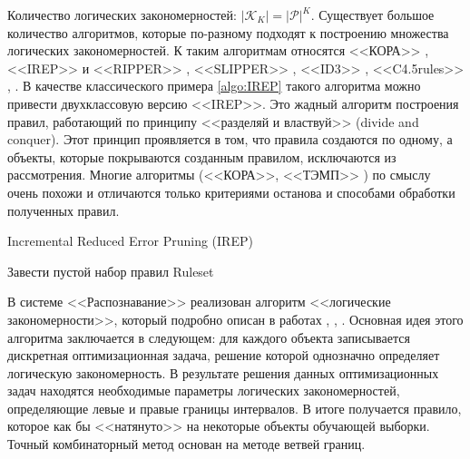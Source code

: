 \documentclass[12pt]{article}
\begin{document}
Количество логических закономерностей: \(\lvert \mathcal{K}_K \rvert =
\lvert \mathcal{P} \rvert^{K}\). Существует большое количество
алгоритмов, которые по-разному подходят к построению множества
логических закономерностей. К таким алгоритмам относятся <<КОРА>>
\cite{vainzvaig73kora}, <<IREP>> и <<RIPPER>> \cite{cohen95fast},
<<SLIPPER>> \cite{cohen99simple}, <<ID3>> \cite{quinlan86induction},
<<C4.5rules>> \cite{quinlan93programs}, \cite{quinlan96bagging}.  В
качестве классического примера \ref{algo:IREP} такого алгоритма можно
привести двухклассовую версию <<IREP>>. Это жадный алгоритм построения
правил, работающий по принципу <<разделяй и властвуй>> (divide and
conquer). Этот принцип проявляется в том, что правила создаются по
одному, а объекты, которые покрываются созданным правилом, исключаются
из рассмотрения. Многие алгоритмы (<<КОРА>>, <<ТЭМП>>
\cite{voron10logicalgs}) по смыслу очень похожи и отличаются только
критериями останова и способами обработки полученных правил.

\begin{algorithm}[\text]
  \caption{Incremental Reduced Error Pruning (IREP)}\label{algo:IREP}
   {
    Завести пустой набор правил Ruleset\;
    \;
  }
\end{algorithm}

В системе <<Распознавание>> реализован алгоритм <<логические
закономерности>>, который подробно описан в работах \cite{kovshov08},
\cite{ryazanov07logic}, \cite{recognition06}. Основная идея этого
алгоритма заключается в следующем: для каждого объекта записывается
дискретная оптимизационная задача, решение которой однозначно
определяет логическую закономерность. В результате решения данных
оптимизационных задач находятся необходимые параметры логических
закономерностей, определяющие левые и правые границы интервалов. В
итоге получается правило, которое как бы <<натянуто>> на некоторые
объекты обучающей выборки. Точный комбинаторный метод основан на
методе ветвей границ.
\end{document}
